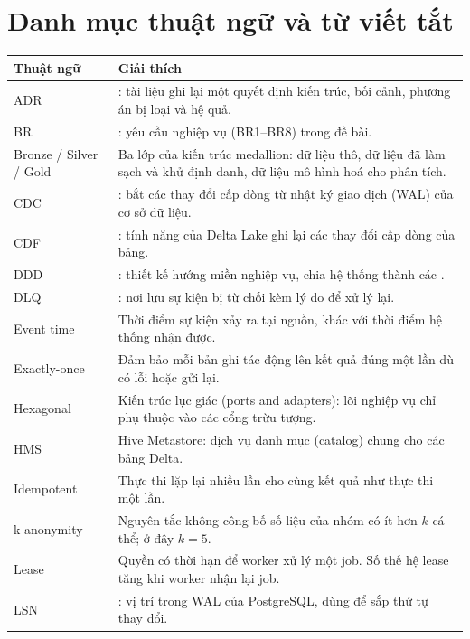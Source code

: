 \section*{Danh mục thuật ngữ và từ viết tắt}

{\small
\begin{longtable}{@{}L{3.4cm}L{11.2cm}@{}}
\toprule
\textbf{Thuật ngữ} & \textbf{Giải thích} \\
\midrule
\endhead
ADR & : tài liệu ghi lại một quyết định kiến trúc, bối cảnh, phương án bị loại và hệ quả. \\
BR & : yêu cầu nghiệp vụ (BR1--BR8) trong đề bài. \\
Bronze / Silver / Gold & Ba lớp của kiến trúc medallion: dữ liệu thô, dữ liệu đã làm sạch và khử định danh, dữ liệu mô hình hoá cho phân tích. \\
CDC & : bắt các thay đổi cấp dòng từ nhật ký giao dịch (WAL) của cơ sở dữ liệu. \\
CDF & : tính năng của Delta Lake ghi lại các thay đổi cấp dòng của bảng. \\
DDD & : thiết kế hướng miền nghiệp vụ, chia hệ thống thành các . \\
DLQ & : nơi lưu sự kiện bị từ chối kèm lý do để xử lý lại. \\
Event time & Thời điểm sự kiện xảy ra tại nguồn, khác với thời điểm hệ thống nhận được. \\
Exactly-once & Đảm bảo mỗi bản ghi tác động lên kết quả đúng một lần dù có lỗi hoặc gửi lại. \\
Hexagonal & Kiến trúc lục giác (ports and adapters): lõi nghiệp vụ chỉ phụ thuộc vào các cổng trừu tượng. \\
HMS & Hive Metastore: dịch vụ danh mục (catalog) chung cho các bảng Delta. \\
Idempotent & Thực thi lặp lại nhiều lần cho cùng kết quả như thực thi một lần. \\
k-anonymity & Nguyên tắc không công bố số liệu của nhóm có ít hơn $k$ cá thể; ở đây $k = 5$. \\
Lease & Quyền có thời hạn để worker xử lý một job. Số thế hệ lease tăng khi worker nhận lại job. \\
LSN & : vị trí trong WAL của PostgreSQL, dùng để sắp thứ tự thay đổi. \\

\end{longtable}}
